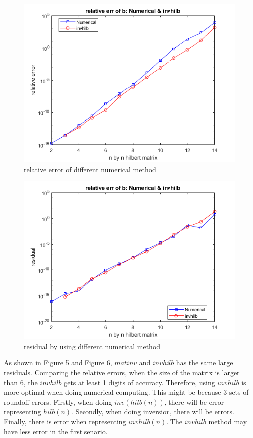 \documentclass[a4paper]{article}
\begin{document}
\begin{figure}[H] 
\centering 
\includegraphics[width=1.0\textwidth]{1.2-3.png}
\caption{relative error of different numerical method} 
\label{Fig.1.2-3} 
\end{figure}

\begin{figure}[H] 
\centering 
\includegraphics[width=1.0\textwidth]{1.2-4.png}
\caption{residual by using different numerical method} 
\label{Fig.1.2-4} 
\end{figure}
As shown in Figure 5 and Figure 6, $matinv$ and $invhilb$ has the same large residuals. Comparing the relative errors, when the size of the matrix is larger than 6, the $invhilb$ gets at least 1 digits of accuracy. Therefore, using $invhilb$ is more optimal when doing numerical computing. This might be because 3 sets of roundoff errors. Firstly, when doing $inv(hilb(n))$, there will be error representing $hilb(n)$. Secondly, when doing inversion, there will be errors. Finally, there is error when representing $invhilb(n)$. The $invhilb$ method may have less error in the first senario.
\end{document}
